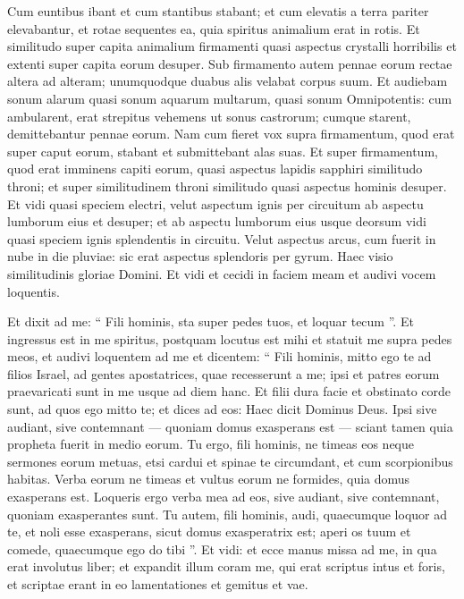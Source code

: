 \begin{biblechapter}
\verse Cum euntibus ibant et cum stantibus stabant; et cum elevatis a terra pariter elevabantur, et rotae sequentes ea, quia spiritus animalium erat in rotis.
 \verse Et similitudo super capita animalium firmamenti quasi aspectus crystalli horribilis et extenti super capita eorum desuper. 
\verse Sub firmamento autem pennae eorum rectae altera ad alteram; unumquodque duabus alis velabat corpus suum.
 \verse Et audiebam sonum alarum quasi sonum aquarum multarum, quasi sonum Omnipotentis: cum ambularent, erat strepitus vehemens ut sonus castrorum; cumque starent, demittebantur pennae eorum. 
\verse Nam cum fieret vox supra firmamentum, quod erat super caput eorum, stabant et submittebant alas suas.
 \verse Et super firmamentum, quod erat imminens capiti eorum, quasi aspectus lapidis sapphiri similitudo throni; et super similitudinem throni similitudo quasi aspectus hominis desuper. 
\verse Et vidi quasi speciem electri, velut aspectum ignis per circuitum ab aspectu lumborum eius et desuper; et ab aspectu lumborum eius usque deorsum vidi quasi speciem ignis splendentis in circuitu. 
\verse Velut aspectus arcus, cum fuerit in nube in die pluviae: sic erat aspectus splendoris per gyrum. Haec visio similitudinis gloriae Domini. Et vidi et cecidi in faciem meam et audivi vocem loquentis.
 
\begin{biblechapter}
\verse Et dixit ad me: “ Fili hominis, sta super pedes tuos, et loquar tecum ”. 
 \verse Et ingressus est in me spiritus, postquam locutus est mihi et statuit me supra pedes meos, et audivi loquentem ad me 
\verse et dicentem: “ Fili hominis, mitto ego te ad filios Israel, ad gentes apostatrices, quae recesserunt a me; ipsi et patres eorum praevaricati sunt in me usque ad diem hanc. 
\verse Et filii dura facie et obstinato corde sunt, ad quos ego mitto te; et dices ad eos: Haec dicit Dominus Deus. 
\verse Ipsi sive audiant, sive contemnant — quoniam domus exasperans est — sciant tamen quia propheta fuerit in medio eorum. 
\verse Tu ergo, fili hominis, ne timeas eos neque sermones eorum metuas, etsi cardui et spinae te circumdant, et cum scorpionibus habitas. Verba eorum ne timeas et vultus eorum ne formides, quia domus exasperans est. 
\verse Loqueris ergo verba mea ad eos, sive audiant, sive contemnant, quoniam exasperantes sunt.
 \verse Tu autem, fili hominis, audi, quaecumque loquor ad te, et noli esse exasperans, sicut domus exasperatrix est; aperi os tuum et comede, quaecumque ego do tibi ”. 
\verse Et vidi: et ecce manus missa ad me, in qua erat involutus liber; et expandit illum coram me, qui erat scriptus intus et foris, et scriptae erant in eo lamentationes et gemitus et vae.
 

\end{biblechapter}
\end{biblechapter}
